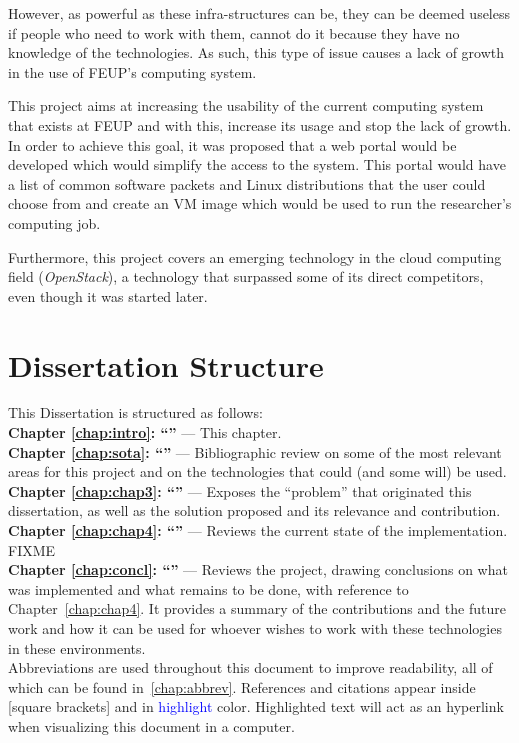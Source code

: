 However, as powerful as these infra-structures can be, they can be deemed useless if people who need to work with them, cannot do it because they have no knowledge of the technologies. As such, this type of issue causes a lack of growth in the use of FEUP's computing system.

This project aims at increasing the usability of the current computing system that exists at FEUP and with this, increase its usage and stop the lack of growth. In order to achieve this goal, it was proposed that a web portal would be developed which would simplify the access to the system. This portal would have a list of common software packets and Linux distributions that the user could choose from and create an VM image which would be used to run the researcher's computing job.

Furthermore, this project covers an emerging technology in the cloud computing field (\textit{OpenStack}), a technology that surpassed some of its direct competitors, even though it was started later.

\section{Dissertation Structure} \label{sec:structure}

This Dissertation is structured as follows:\\
\textbf{Chapter \ref{chap:intro}: ``'' } --- This chapter.\\
\textbf{Chapter \ref{chap:sota}: ``'' } --- Bibliographic review on some of the most relevant areas for this project and on the technologies that could (and some will) be used.\\
\textbf{Chapter \ref{chap:chap3}: ``'' } --- Exposes the ``problem'' that originated this dissertation, as well as the solution proposed and its relevance and contribution.\\
\textbf{Chapter \ref{chap:chap4}: ``'' } --- Reviews the current state of the implementation. FIXME\\
\textbf{Chapter \ref{chap:concl}: ``'' } --- Reviews the project, drawing conclusions on what was implemented and what remains to be done, with reference to Chapter~\ref{chap:chap4}. It provides a summary of the contributions and the future work and how it can be used for whoever wishes to work with these technologies in these environments.\\

Abbreviations are used throughout this document to improve readability, all of which can be found in~\ref{chap:abbrev}. References and citations appear inside [square brackets] and in \textcolor{blue}{highlight} color. Highlighted text will act as an hyperlink when visualizing this document in a computer.
